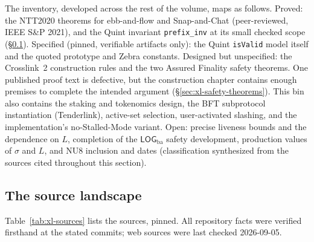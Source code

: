 \documentclass[11pt,a4paper]{article}
\theoremstyle{definition}
\begin{document}
The inventory, developed across the rest of the volume, maps as
follows. Proved: the NTT2020 theorems for ebb-and-flow and Snap-and-Chat
(peer-reviewed, IEEE S\&P 2021), and the Quint invariant
\texttt{prefix\_inv} at its small checked scope
(\S\ref{sec:xl-sources}). Specified (pinned, verifiable artifacts only):
the Quint \texttt{isValid} model itself and the quoted prototype and
Zebra constants. Designed but unspecified: the Crosslink~2 construction
rules and the two Assured Finality safety theorems. One published proof
text is defective, but the construction chapter contains enough premises
to complete the intended argument (\S\ref{sec:xl-safety-theorems}). This
bin also contains the staking and tokenomics design, the BFT subprotocol
instantiation (Tenderlink), active-set selection, user-activated slashing,
and the implementation's no-Stalled-Mode variant. Open: precise liveness
bounds and the dependence on $L$,
completion of the $\mathsf{LOG}_{\mathrm{ba}}$ safety development,
production values of $\sigma$ and $L$, and NU8 inclusion and dates
(classification synthesized from the sources cited throughout this
section).

\subsection{The source landscape}\label{sec:xl-sources}

Table~\ref{tab:xl-sources} lists the sources, pinned. All repository facts
were verified firsthand at the stated commits; web sources were last
checked 2026-09-05.
\end{document}
